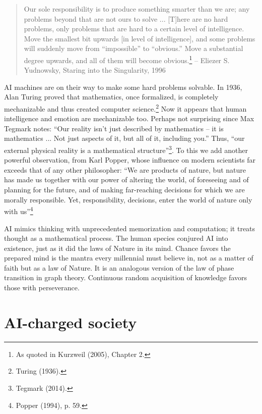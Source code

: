 \begin{multicols}{2}
\begin{quote}
Our sole responsibility is to produce something smarter than we are; any problems beyond that are not ours to solve ... [T]here are no hard problems, only problems that are hard to a certain level of intelligence. Move the smallest bit upwards [in level of intelligence], and some problems will suddenly move from “impossible” to “obvious.” Move a substantial degree upwards, and all of them will become obvious.\footnote{As quoted in Kurzweil (2005), Chapter 2.}  -- Eliezer S. Yudnowsky, Staring into the Singularity, 1996 
\end{quote}

AI machines are on their way to make some hard problems solvable. In 1936, Alan Turing proved that mathematics, once formalized, is completely mechanizable and thus created computer science.\footnote{Turing (1936).}  Now it appears that human intelligence and emotion are mechanizable too. Perhaps not surprising since Max Tegmark notes: “Our reality isn't just described by mathematics – it is mathematics ... Not just aspects of it, but all of it, including you.” Thus, “our external physical reality is a mathematical structure”\footnote{Tegmark (2014).}. To this we add another powerful observation, from Karl Popper, whose influence on modern scientists far exceeds that of any other philosopher: “We are products of nature, but nature has made us together with our power of altering the world, of foreseeing and of planning for the future, and of making far-reaching decisions for which we are morally responsible. Yet, responsibility, decisions, enter the world of nature only with us”\footnote{Popper (1994), p. 59.}

AI mimics thinking with unprecedented memorization and computation; it treats thought as a mathematical process. The human species conjured AI into existence, just as it did the laws of Nature in its mind. Chance favors the prepared mind is the mantra every millennial must believe in, not as a matter of faith but as a law of Nature. It is an analogous version of the law of phase transition in graph theory. Continuous random acquisition of knowledge favors those with perseverance. 

\section{AI-charged society}


\end{multicols}

